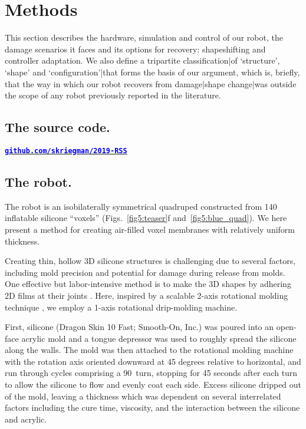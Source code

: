 
\section{Methods}
\label{sec5:methods}

This section describes the hardware, simulation and control of our robot,
the damage scenarios it faces and its options for recovery: 
shapeshifting and controller adaptation.
We also define a tripartite classification|of `structure', `shape' and `configuration'|that forms the basis of our argument, which is, briefly, that the way in which our robot recovers from damage|shape change|was outside the scope of any robot previously reported in the literature.


\subsection*{The source code.}
\href{https://github.com/skriegman/2019-RSS}{\textcolor{blue}{\textbf{\texttt{github.com/skriegman/2019-RSS}}}}



\subsection*{The robot.}
\label{sec5:robot}





The robot is an isobilaterally symmetrical quadruped constructed from 140 inflatable silicone ``voxels'' 
(Figs.~\ref{fig5:teaser}f and~\ref{fig5:blue_quad}).
We here present a method for creating air-filled voxel membranes with relatively uniform thickness.


Creating thin, hollow 3D silicone structures is challenging due to several factors, including mold precision and potential for damage during release from molds. One effective but labor-intensive method is to make the 3D shapes by adhering 2D films at their joints \cite{morin_elastomeric_2014}. Here, inspired by a scalable 2-axis rotational molding technique \cite{zhao_scalable_2015}, we employ a \mbox{1-axis} rotational drip-molding machine.

First, silicone (Dragon Skin 10 Fast; Smooth-On, Inc.) was poured into an open-face acrylic mold and a tongue depressor was used to roughly spread the silicone along the walls. The mold was then attached to the rotational molding machine with the rotation axis oriented downward at 45 degrees relative to horizontal, and run through cycles comprising a 90\textdegree~turn, stopping for 45 seconds after each turn to allow the silicone to flow and evenly coat each side. Excess silicone dripped out of the mold, leaving a thickness which was dependent on several interrelated factors including the cure time, viscosity, and the interaction between the silicone and acrylic.

